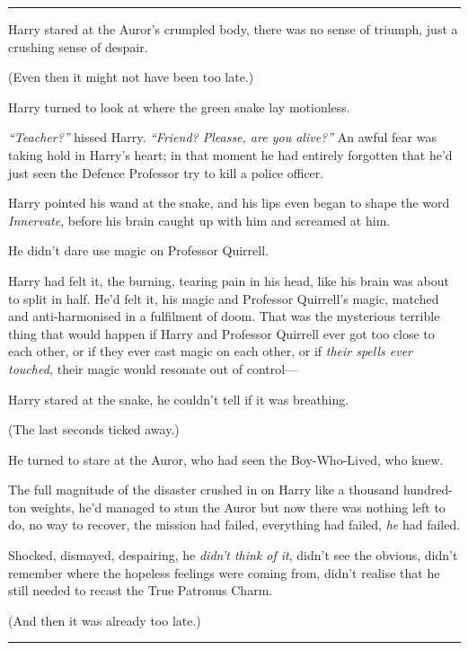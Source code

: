 \begin{center}\rule{3in}{0.4pt}\end{center}

Harry stared at the Auror's crumpled body, there was no sense of
triumph, just a crushing sense of despair.

(Even then it might not have been too late.)

Harry turned to look at where the green snake lay motionless.

\emph{``Teacher?''} hissed Harry. \emph{``Friend? Pleasse, are you
alive?''} An awful fear was taking hold in Harry's heart; in that moment
he had entirely forgotten that he'd just seen the Defence Professor try
to kill a police officer.

Harry pointed his wand at the snake, and his lips even began to shape
the word \emph{Innervate}, before his brain caught up with him and
screamed at him.

He didn't dare use magic on Professor Quirrell.

Harry had felt it, the burning, tearing pain in his head, like his brain
was about to split in half. He'd felt it, his magic and Professor
Quirrell's magic, matched and anti-harmonised in a fulfilment of doom.
That was the mysterious terrible thing that would happen if Harry and
Professor Quirrell ever got too close to each other, or if they ever
cast magic on each other, or if \emph{their spells ever touched,} their
magic would resonate out of control---

Harry stared at the snake, he couldn't tell if it was breathing.

(The last seconds ticked away.)

He turned to stare at the Auror, who had seen the Boy-Who-Lived, who
knew.

The full magnitude of the disaster crushed in on Harry like a thousand
hundred-ton weights, he'd managed to stun the Auror but now there was
nothing left to do, no way to recover, the mission had failed,
everything had failed, \emph{he} had failed.

Shocked, dismayed, despairing, he \emph{didn't think of it}, didn't see
the obvious, didn't remember where the hopeless feelings were coming
from, didn't realise that he still needed to recast the True Patronus
Charm.

(And then it was already too late.)

\begin{center}\rule{3in}{0.4pt}\end{center}

